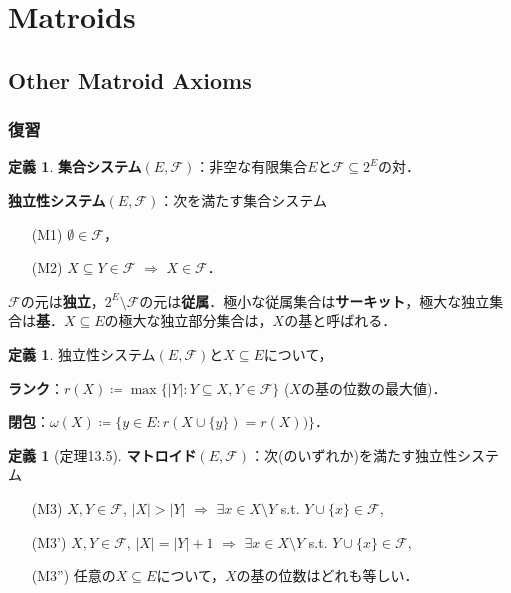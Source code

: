 \documentclass[xelatex,ja=standard,a4paper,14pt,everyparhook=compat]{bxjsarticle}
\theoremstyle{definition}
\newtheorem{definition}[theorem]{定義}
\begin{document}
\setcounter{section}{12}
\section{Matroids}
\setcounter{subsection}{1}
\subsection{Other Matroid Axioms}

\subsubsection*{復習}

\begin{definition}
    \textbf{集合システム}$(E, \mathcal{F})$：非空な有限集合$E$と$\mathcal{F} \subseteq 2^E$の対．

    \textbf{独立性システム}$(E, \mathcal{F})$：次を満たす集合システム \begin{enumerate}
        \item[(M1)] $\emptyset \in \mathcal{F}$，
        \item[(M2)] $X \subseteq Y \in \mathcal{F}$ $\Rightarrow$ $X \in \mathcal{F}$．
    \end{enumerate}
    $\mathcal{F}$の元は\textbf{独立}，$2^E \setminus \mathcal{F}$の元は\textbf{従属}．極小な従属集合は\textbf{サーキット}，極大な独立集合は\textbf{基}．$X \subseteq E$の極大な独立部分集合は，$X$の基と呼ばれる．
\end{definition}

\begin{definition}
    独立性システム$(E, \mathcal{F})$と$X \subseteq E$について，

    \textbf{ランク}：$r(X) \coloneqq \max\{|Y| : Y \subseteq X, Y \in \mathcal{F}\}$ ($X$の基の位数の最大値)．

    \textbf{閉包}：$\omega(X) \coloneqq \{y \in E : r(X \cup \{y\}) = r(X))\}$．
\end{definition}

\begin{definition}[定理13.5]
    \textbf{マトロイド}$(E, \mathcal{F})$：次(のいずれか)を満たす独立性システム \begin{enumerate}
        \item[(M3)] $X, Y \in \mathcal{F}$, $|X| > |Y|$ $\Longrightarrow$ $\exists x \in X \setminus Y$ s.t. $Y \cup \{x\} \in \mathcal{F}$,
        \item[(M3')] $X, Y \in \mathcal{F}$, $|X| = |Y| + 1$ $\Longrightarrow$ $\exists x \in X \setminus Y$ s.t. $Y \cup \{x\} \in \mathcal{F}$,
        \item[(M3'')] 任意の$X \subseteq E$について，$X$の基の位数はどれも等しい．
    \end{enumerate}
\end{definition}
\end{document}
